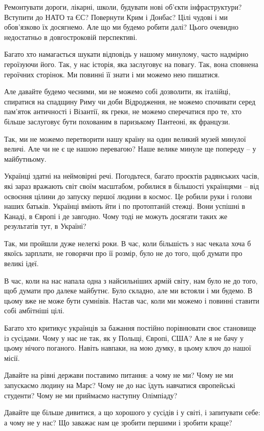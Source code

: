 Ремонтувати дороги, лікарні, школи, будувати нові об’єкти інфраструктури?
Вступити до НАТО та ЄС? Повернути Крим і Донбас? Цілі чудові і ми обов’язково
їх досягнемо. Але що ми будемо робити далі? Цього очевидно недостатньо в
довгостроковій перспективі.

Багато хто намагається шукати відповідь у нашому минулому, часто надмірно
героїзуючи його. Так, у нас історія, яка заслуговує на повагу. Так, вона
сповнена героїчних сторінок. Ми повинні її знати і ми можемо нею пишатися. 

Але давайте будемо чесними, ми не можемо собі дозволити, як італійці, спиратися
на спадщину Риму чи доби Відродження, не можемо спочивати серед пам’яток
античності і Візантії, як греки, не можемо сперечатися про те, хто більше
заслуговує бути похованим в паризькому Пантеоні, як французи. 

Так, ми не можемо перетворити нашу країну на один великий музей минулої величі.
Але чи не є це нашою перевагою? Наше велике минуле ще попереду – у майбутньому. 

Українці здатні на неймовірні речі. Погодьтеся, багато проєктів радянських
часів, які зараз вражають світ своїм масштабом, робилися в більшості українцями
– від освоєння цілини до запуску першої людини в космос. Це робили руки і
голови наших батьків. Українці вміють йти і по протоптаній стежці. Вони успішні
в Канаді, в Європі і де завгодно. Чому тоді не можуть досягати таких же
результатів тут, в Україні?

Так, ми пройшли дуже нелегкі роки. В час, коли більшість з нас чекала хоча б
якоїсь зарплати, не говорячи про її розмір, було не до того, щоб думати про
великі ідеї. 

В час, коли на нас напала одна з найсильніших армій світу, нам було не до того,
щоб думати про далеке майбутнє. Було складно, але ми встояли і ми будемо. В
цьому вже не може бути сумнівів. Настав час, коли ми можемо і повинні ставити
собі амбітніші цілі.

Багато хто критикує українців за бажання постійно порівнювати своє становище із сусідами. Чому у нас не так, як у Польщі, Європі, США? Але я не бачу у цьому нічого поганого. Навіть навпаки, на мою думку, в цьому ключ до нашої місії.

Давайте на рівні держави поставимо питання: а чому не ми? Чому не ми запускаємо
людину на Марс? Чому не до нас їдуть навчатися європейські студенти? Чому не ми
приймаємо наступну Олімпіаду? 

Давайте ще більше дивитися, а що хорошого у сусідів і у світі, і запитувати
себе: а чому не у нас? Що заважає нам це зробити першими і зробити краще? 

